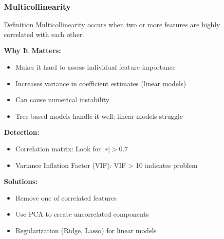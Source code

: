 \documentclass[aspectratio=169]{beamer}
\begin{document}
\begin{frame}
\frametitle{Multicollinearity}

\begin{block}{Definition}
Multicollinearity occurs when two or more features are highly correlated with each other.
\end{block}

\vspace{0.3cm}

\textbf{Why It Matters:}
\begin{itemize}
    \item Makes it hard to assess individual feature importance
    \item Increases variance in coefficient estimates (linear models)
    \item Can cause numerical instability
    \item Tree-based models handle it well; linear models struggle
\end{itemize}

\vspace{0.3cm}

\textbf{Detection:}
\begin{itemize}
    \item Correlation matrix: Look for $|r| > 0.7$
    \item Variance Inflation Factor (VIF): VIF > 10 indicates problem
\end{itemize}

\vspace{0.3cm}

\textbf{Solutions:}
\begin{itemize}
    \item Remove one of correlated features
    \item Use PCA to create uncorrelated components
    \item Regularization (Ridge, Lasso) for linear models
\end{itemize}

\end{frame}
\end{document}
